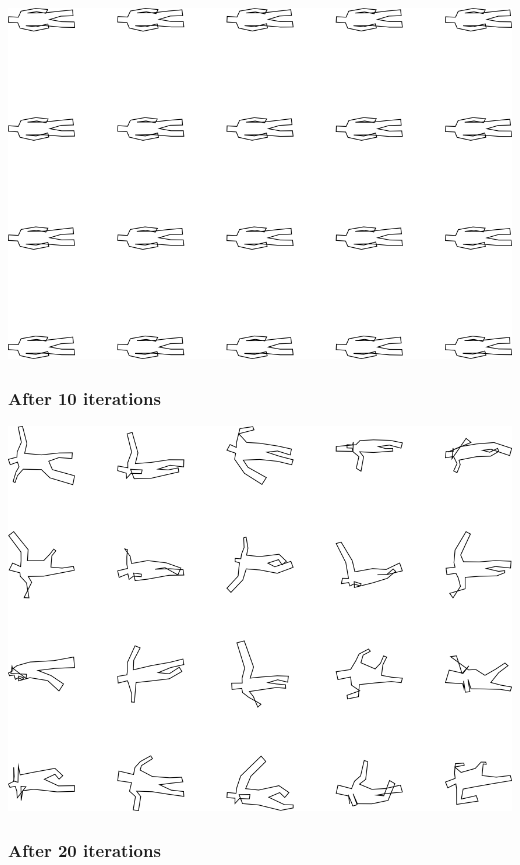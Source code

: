\includegraphics[width=6in]{output/3.learning/multi_tuning/multi_tuning_iter0_.png}
\subsubsection{After 10 iterations}

\includegraphics[width=6in]{output/3.learning/multi_tuning/multi_tuning_iter10_.png}
\subsubsection{After 20 iterations}


